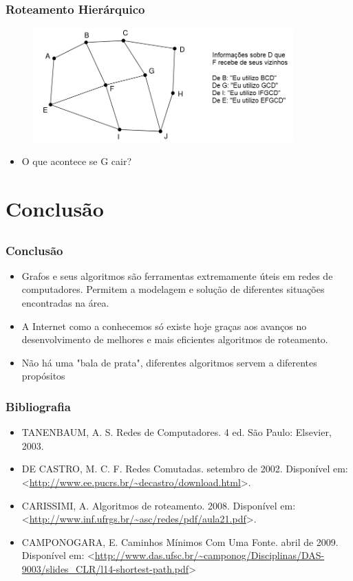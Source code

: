 \documentclass{beamer}
\begin{document}
\begin{frame}
\frametitle{Roteamento Hierárquico}
\begin{figure}[htp]
\begin{center}
  \includegraphics[width=100mm]{Imagens/RoteamentoHierarquico.png}
  \label{roteamento_hierarquico}
\end{center}
\end{figure}
\begin{itemize}
  \item O que acontece se G cair?
\end{itemize}
\end{frame}


\section{Conclusão}
\subsection{}

\begin{frame}
\frametitle{Conclusão}
\begin{itemize}
  \setlength{\itemsep}{0.7cm}%
  \item Grafos e seus algoritmos são ferramentas extremamente úteis em redes de
  computadores. Permitem a modelagem e solução de diferentes situações encontradas na área.
  \item A Internet como a conhecemos só existe hoje graças aos avanços no
  desenvolvimento de melhores e mais eficientes algoritmos de roteamento.
  \item Não há uma "bala de prata", diferentes algoritmos servem a diferentes
  propósitos
\end{itemize}
\end{frame}

\begin{frame}
\frametitle{Bibliografia}
\begin{itemize}
  \item TANENBAUM, A. S. Redes de Computadores. 4 ed. São Paulo: Elsevier, 2003.
  \item DE CASTRO, M. C. F. Redes Comutadas. setembro de 2002. Disponível em:
  <\url{http://www.ee.pucrs.br/~decastro/download.html}>.
  \item CARISSIMI, A. Algoritmos de roteamento. 2008. Disponível em:
  <\url{http://www.inf.ufrgs.br/~asc/redes/pdf/aula21.pdf}>.
  \item CAMPONOGARA, E. Caminhos Mínimos Com Uma Fonte. abril de 2009.
  Disponível em:
  <\url{http://www.das.ufsc.br/~camponog/Disciplinas/DAS-9003/slides_CLR/l14-shortest-path.pdf}>
\end{itemize}
\end{frame}
\end{document}
